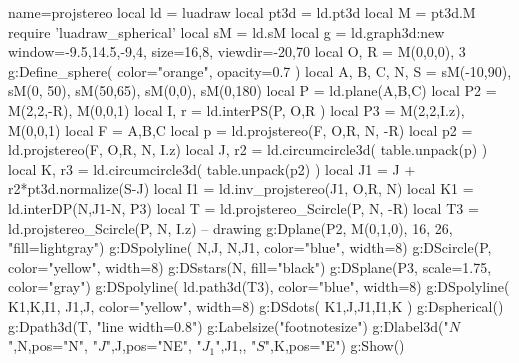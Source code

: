 \documentclass[border=2pt]{standalone}%
\begin{document}
\begin{luadraw}{name=projstereo}
local ld = luadraw
local pt3d = ld.pt3d
local M = pt3d.M
require 'luadraw_spherical'
local sM = ld.sM
local g = ld.graph3d:new{ window={-9.5,14.5,-9,4}, size={16,8}, viewdir={-20,70}}
local O, R = M(0,0,0), 3
g:Define_sphere( {color="orange", opacity=0.7} )
local A, B, C, N, S = sM(-10,90), sM(0, 50), sM(50,65), sM(0,0), sM(0,180)
local P = ld.plane(A,B,C)
local P2 = {M(2,2,-R), M(0,0,1)}
local I, r = ld.interPS(P, {O,R} )
local P3 = {M(2,2,I.z), M(0,0,1)}
local F = {A,B,C}
local p = ld.projstereo(F, {O,R}, N, -R)
local p2 = ld.projstereo(F, {O,R}, N, I.z)
local J, r2 = ld.circumcircle3d( table.unpack(p) )
local K, r3 = ld.circumcircle3d( table.unpack(p2) )
local J1 = J + r2*pt3d.normalize(S-J)
local I1 = ld.inv_projstereo(J1, {O,R}, N)
local K1 = ld.interDP({N,J1-N}, P3) 
local T = ld.projstereo_Scircle(P, N, -R)
local T3 = ld.projstereo_Scircle(P, N, I.z)
-- drawing
g:Dplane(P2, M(0,1,0), 16, 26, "fill=lightgray")
g:DSpolyline( {{N,J}, {N,J1}}, {color="blue", width=8})
g:DScircle(P, {color="yellow", width=8})
g:DSstars(N, {fill="black"})
g:DSplane(P3, {scale=1.75, color="gray"})
g:DSpolyline( ld.path3d(T3), {color="blue", width=8})
g:DSpolyline( {{K1,K,I1}, {J1,J}}, {color="yellow", width=8})
g:DSdots( {K1,J,J1,I1,K} )
g:Dspherical()
g:Dpath3d(T, "line width=0.8")
g:Labelsize("footnotesize")
g:Dlabel3d("$N$",N,{pos="N"}, "$J$",J,{pos="NE"}, "$J_1$",J1,{}, "$S$",K,{pos="E"})
g:Show()
\end{luadraw}
\end{document}
